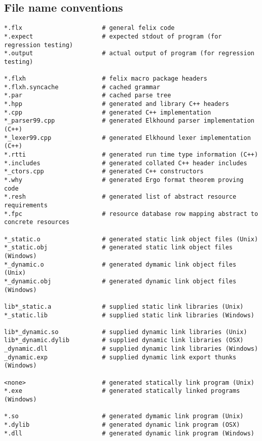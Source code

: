 \documentclass{report}
\begin{document}
\subsection{File name conventions}
\begin{verbatim}
*.flx                      # general felix code
*.expect                   # expected stdout of program (for regression testing)
*.output                   # actual output of program (for regression testing)

*.flxh                     # felix macro package headers
*.flxh.syncache            # cached grammar
*.par                      # cached parse tree
*.hpp                      # generated and library C++ headers
*.cpp                      # generated C++ implementation
*_parser99.cpp             # generated Elkhound parser implementation (C++)
*_lexer99.cpp              # generated Elkhound lexer implementation (C++)
*.rtti                     # generated run time type information (C++)
*.includes                 # generated collated C++ header includes
*_ctors.cpp                # generated C++ constructors
*.why                      # generated Ergo format theorem proving code
*.resh                     # generated list of abstract resource requirements
*.fpc                      # resource database row mapping abstract to concrete resources

*_static.o                 # generated static link object files (Unix)
*_static.obj               # generated static link object files (Windows)
*_dynamic.o                # generated dymamic link object files (Unix)
*_dynamic.obj              # generated dynamic link object files (Windows)

lib*_static.a              # supplied static link libraries (Unix)
*_static.lib               # supplied static link libraries (Windows)

lib*_dynamic.so            # supplied dynamic link libraries (Unix)
lib*_dynamic.dylib         # supplied dynamic link libraries (OSX)
_dynamic.dll               # supplied dynamic link libraries (Windows)
_dynamic.exp               # supplied dynamic link export thunks (Windows)

<none>                     # generated statically link program (Unix)
*.exe                      # generated statically linked programs (Windows)

*.so                       # generated dymamic link program (Unix)
*.dylib                    # generated dynamic link program (OSX)
*.dll                      # generated dynamic link program (Windows)
\end{verbatim}
\end{document}
